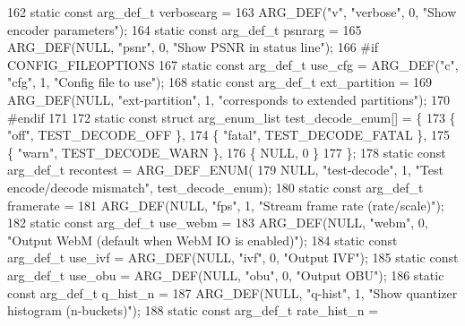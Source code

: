 \begin{DoxyCodeInclude}
{{162 \textcolor{keyword}{static} \textcolor{keyword}{const} arg\_def\_t verbosearg =
163     ARG\_DEF(\textcolor{stringliteral}{"v"}, \textcolor{stringliteral}{"verbose"}, 0, \textcolor{stringliteral}{"Show encoder parameters"});
164 \textcolor{keyword}{static} \textcolor{keyword}{const} arg\_def\_t psnrarg =
165     ARG\_DEF(NULL, \textcolor{stringliteral}{"psnr"}, 0, \textcolor{stringliteral}{"Show PSNR in status line"});
166 \textcolor{preprocessor}{#if CONFIG\_FILEOPTIONS}
167 \textcolor{keyword}{static} \textcolor{keyword}{const} arg\_def\_t use\_cfg = ARG\_DEF(\textcolor{stringliteral}{"c"}, \textcolor{stringliteral}{"cfg"}, 1, \textcolor{stringliteral}{"Config file to use"});
168 \textcolor{keyword}{static} \textcolor{keyword}{const} arg\_def\_t ext\_partition =
169     ARG\_DEF(NULL, \textcolor{stringliteral}{"ext-partition"}, 1, \textcolor{stringliteral}{"corresponds to extended partitions"});
170 \textcolor{preprocessor}{#endif}
171 
172 \textcolor{keyword}{static} \textcolor{keyword}{const} \textcolor{keyword}{struct }arg\_enum\_list test\_decode\_enum[] = \{
173     \{ \textcolor{stringliteral}{"off"}, TEST\_DECODE\_OFF \},
174     \{ \textcolor{stringliteral}{"fatal"}, TEST\_DECODE\_FATAL \},
175     \{ \textcolor{stringliteral}{"warn"}, TEST\_DECODE\_WARN \},
176     \{ NULL, 0 \}
177 \};
178 \textcolor{keyword}{static} \textcolor{keyword}{const} arg\_def\_t recontest = ARG\_DEF\_ENUM(
179     NULL, \textcolor{stringliteral}{"test-decode"}, 1, \textcolor{stringliteral}{"Test encode/decode mismatch"}, test\_decode\_enum);
180 \textcolor{keyword}{static} \textcolor{keyword}{const} arg\_def\_t framerate =
181     ARG\_DEF(NULL, \textcolor{stringliteral}{"fps"}, 1, \textcolor{stringliteral}{"Stream frame rate (rate/scale)"});
182 \textcolor{keyword}{static} \textcolor{keyword}{const} arg\_def\_t use\_webm =
183     ARG\_DEF(NULL, \textcolor{stringliteral}{"webm"}, 0, \textcolor{stringliteral}{"Output WebM (default when WebM IO is enabled)"});
184 \textcolor{keyword}{static} \textcolor{keyword}{const} arg\_def\_t use\_ivf = ARG\_DEF(NULL, \textcolor{stringliteral}{"ivf"}, 0, \textcolor{stringliteral}{"Output IVF"});
185 \textcolor{keyword}{static} \textcolor{keyword}{const} arg\_def\_t use\_obu = ARG\_DEF(NULL, \textcolor{stringliteral}{"obu"}, 0, \textcolor{stringliteral}{"Output OBU"});
186 \textcolor{keyword}{static} \textcolor{keyword}{const} arg\_def\_t q\_hist\_n =
187     ARG\_DEF(NULL, \textcolor{stringliteral}{"q-hist"}, 1, \textcolor{stringliteral}{"Show quantizer histogram (n-buckets)"});
188 \textcolor{keyword}{static} \textcolor{keyword}{const} arg\_def\_t rate\_hist\_n =
}}
\end{DoxyCodeInclude}
